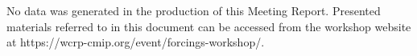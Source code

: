 \documentclass{ametsocV6.1}
\begin{document}
% 
%
\datastatement
No data was generated in the production of this Meeting Report. Presented materials referred to in this document can be accessed from the workshop website at https://wcrp-cmip.org/event/forcings-workshop/.




\end{document}
